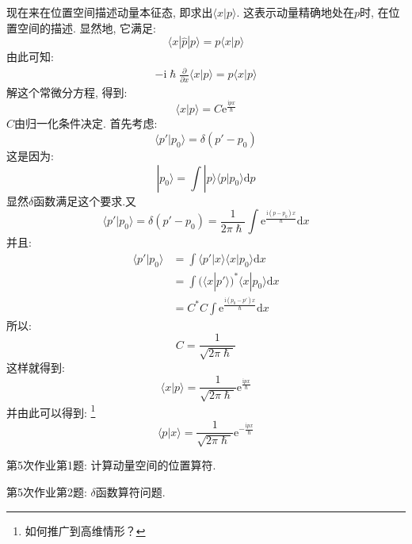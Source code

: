         现在来在位置空间描述动量本征态, 即求出$\langle x|p \rangle$. 
        这表示动量精确地处在$p$时, 在位置空间的描述. 显然地, 它满足: 
        \begin{equation}
            \langle x|\hat{p}|p\rangle = p\langle x|p \rangle
        \end{equation}
        由此可知: 
        \begin{equation}\begin{aligned}
            -\mathrm{i}\hslash \frac {\partial}{\partial x} \langle x|p \rangle = p \langle x|p \rangle
        \end{aligned}\end{equation}
        解这个常微分方程, 得到: 
        \begin{equation}
            \langle x|p \rangle = C \mathrm{e}^{\frac {\mathrm{i}px}\hslash}
        \end{equation}
        $C$由归一化条件决定. 首先考虑:
        \begin{equation}
            \langle p' | p_0 \rangle = \delta (p'-p_0)
        \end{equation}
        这是因为: 
        \begin{equation}
            |p_0 \rangle = \int |p\rangle \langle p|p_0\rangle \mathrm{d}p
        \end{equation}
        显然$\delta$函数满足这个要求.又
        \begin{equation}
            \langle p' | p_0 \rangle = \delta (p'-p_0) = \frac 1{2\pi\hslash} \int \mathrm{e}^{\frac {\mathrm{i}(p-p_0)x}{\hslash}} \mathrm{d}x
        \end{equation}
        并且: 
        \begin{equation}\begin{aligned}
            \langle p'|p_0 \rangle &= \int \langle p'|x\rangle \langle x|p_0 \rangle \mathrm{d}x\\
            &= \int (\langle x|p' \rangle)^* \langle x|p_0 \rangle \mathrm{d}x\\
            &= C^*C\int \mathrm{e}^{\frac {\mathrm{i}(p_0-p')x}{\hslash}} \mathrm{d}x
        \end{aligned}\end{equation}
        所以: 
        \begin{equation}
            C = \frac 1{\sqrt{2\pi\hslash}}
        \end{equation}
        这样就得到: 
        \begin{equation}
            \langle x|p \rangle = \frac 1{\sqrt{2\pi\hslash}} \mathrm{e}^{\frac {\mathrm{i}px}{\hslash}}
        \end{equation}
        并由此可以得到: 
        \footnote{如何推广到高维情形？}
        \begin{equation}
            \langle p|x \rangle = \frac 1{\sqrt{2\pi\hslash}} \mathrm{e}^{-\frac {\mathrm{i}px}{\hslash}}
        \end{equation}
        \begin{asg}
            第5次作业第1题: 计算动量空间的位置算符.
        \end{asg}
        \begin{asg}
            第5次作业第2题: $\delta$函数算符问题.
        \end{asg}

